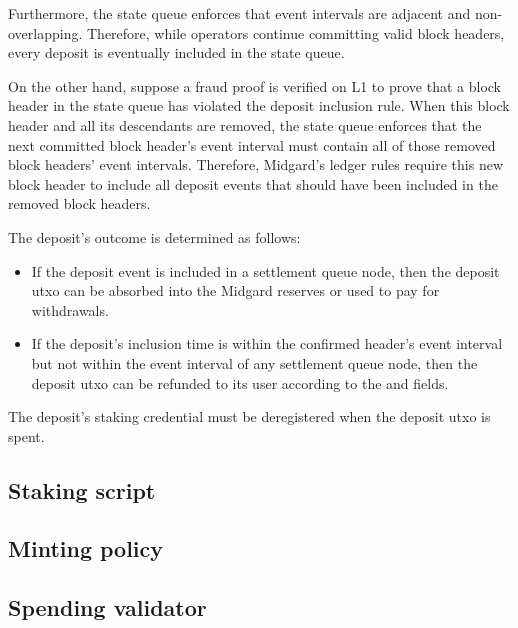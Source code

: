 \documentclass[../midgard.tex]{subfiles}
\begin{document}
Furthermore, the state queue enforces that event intervals are adjacent and non-overlapping.
Therefore, while operators continue committing valid block headers, every deposit is eventually included in the state queue.

On the other hand, suppose a fraud proof is verified on L1 to prove that a block header in the state queue has violated the deposit inclusion rule.
When this block header and all its descendants are removed, the state queue enforces that the next committed block header's event interval must contain all of those removed block headers' event intervals.
Therefore, Midgard's ledger rules require this new block header to include all deposit events that should have been included in the removed block headers.

The deposit's outcome is determined as follows:
\begin{itemize}
    \item If the deposit event is included in a settlement queue node, then the deposit utxo can be absorbed into the Midgard reserves or used to pay for withdrawals.
    \item If the deposit's inclusion time is within the confirmed header's event interval but not within the event interval of any settlement queue node, then the deposit utxo can be refunded to its user according to the  and  fields.
\end{itemize}

The deposit's  staking credential must be deregistered when the deposit utxo is spent.

\subsection{Staking script}
\label{h:deposit-staking-script}

\subsection{Minting policy}
\label{h:deposit-minting-policy}

\subsection{Spending validator}
\label{h:deposit-spending-validator}

\todo
\end{document}
